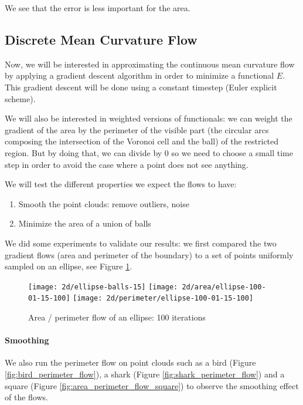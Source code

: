 We see that the error is less important for the area.

\subsection{Discrete Mean Curvature Flow}

Now, we will be interested in approximating the continuous mean curvature flow
by applying a gradient descent algorithm in order to minimize a functional $ E
$. This gradient descent will be done using a constant timestep (Euler explicit
scheme).

We will also be interested in weighted versions of functionals: we can weight
the gradient of the area by the perimeter of the visible part (the circular arcs
composing the intersection of the Voronoi cell and the ball) of the restricted
region. But by doing that, we can divide by $ 0 $ so we need to choose a small
time step in order to avoid the case where a point does not see anything.

We will test the different properties we expect the flows to have:
\begin{enumerate}
    \item Smooth the point clouds: remove outliers, noise
    \item Minimize the area of a union of balls
\end{enumerate}


We did some experiments to validate our results: we first compared the two
gradient flows (area and perimeter of the boundary) to a set of points uniformly
sampled on an ellipse, see Figure \ref{fig:ellipse_flows}.

\begin{figure}[h]
    \centering

    \texttt{[image: 2d/ellipse-balls-15]}
    \texttt{[image: 2d/area/ellipse-100-01-15-100]}
    \texttt{[image: 2d/perimeter/ellipse-100-01-15-100]}
    \caption{Area / perimeter flow of an ellipse: 100 iterations}
    \label{fig:ellipse_flows}
\end{figure}

\paragraph{Smoothing}

We also run the perimeter flow on point clouds such as a bird (Figure
\ref{fig:bird_perimeter_flow}), a shark (Figure \ref{fig:shark_perimeter_flow})
and a square (Figure \ref{fig:area_perimeter_flow_square}) to observe the
smoothing effect of the flows.


